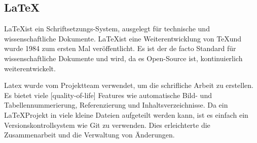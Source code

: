 \subsection{\LaTeX}
\label{sec:latex}

\LaTeX ist ein Schriftsetzungs-System, ausgelegt für technische und wissenschaftliche Dokumente. \LaTeX ist eine Weiterentwicklung von \TeX und wurde 1984 zum ersten Mal veröffentlicht. Es ist der de facto Standard für wissenschaftliche Dokumente und wird, da es Open-Source ist, kontinuierlich weiterentwickelt. 

\bigskip

\noindent Latex wurde vom Projektteam verwendet, um die schrifliche Arbeit zu erstellen. Es bietet viele [quality-of-life] Features wie automatische Bild- und Tabellennummerierung, Referenzierung und Inhaltsverzeichnisse. Da ein \LaTeX Projekt in viele kleine Dateien aufgeteilt werden kann, ist es einfach ein Versionskontrollsystem wie Git zu verwenden. Dies erleichterte die Zusammenarbeit und die Verwaltung von Änderungen.
